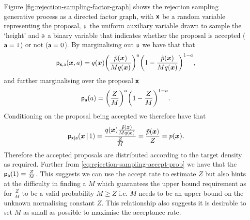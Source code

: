 Figure \ref{fig:rejection-sampling-factor-graph} shows the rejection sampling generative process as a directed factor graph, with $\boldsymbol{\mathsf{x}}$ be a random variable representing the proposal, $\mathsf{u}$ the uniform auxiliary variable drawn to sample the `height' and $\mathsf{a}$ a binary variable that indicates whether the proposal is accepted ($\mathsf{a} = 1$) or not ($\mathsf{a} = 0$). By marginalising out $\mathsf{u}$ we have that that
\begin{equation}\label{eq:rejection-sampling-joint-prob}
  \pden{\rvct{x},\rvar{a}}(\vct{x},a) = 
  q(\vct{x}) \lpa\frac{\utgtdens(\vct{x})}{Mq(\vct{x})}\rpa^a
  \lpa1 - \frac{\utgtdens(\vct{x})}{Mq(\vct{x})}\rpa^{1-a},
\end{equation}
and further marginalising over the proposal $\boldsymbol{\mathsf{x}}$
\begin{equation}\label{eq:rejection-sampling-accept-prob}
  \pden{\rvar{a}}(a) = \lpa\frac{Z}{M}\rpa^a \lpa 1 - \frac{Z}{M}\rpa^{1-a}.
\end{equation}
Conditioning on the proposal being accepted we therefore have that
\begin{equation}\label{eq:rejection-sampling-cond-dens-given-accept}
  \mathsf{p}_{\boldsymbol{\mathsf{x}}|\mathsf{a}}(\boldsymbol{x}\operatorname{|} 1) =
  \frac{q(\boldsymbol{x})\frac{\tilde{p}(\boldsymbol{x})}{Mq(\boldsymbol{x})}}{\frac{Z}{M}} = \frac{\tilde{p}(\boldsymbol{x})}{Z} = p(\boldsymbol{x}).
\end{equation}
Therefore the accepted proposals are distributed according to the target density as required. Further from \eqref{eq:rejection-sampling-accept-prob} we have that the $\mathsf{p}_{\mathsf{a}}(1) = \frac{Z}{M}$. This suggests we can use the accept rate to estimate $Z$ but also hints at the difficulty in finding a $M$ which guarantees the upper bound requirement as for $\frac{Z}{M}$ to be a valid probability $M \geq Z$ i.e. $M$ needs to be an upper bound on the unknown normalising constant $Z$. This relationship also suggests it is desirable to set $M$ as small as possible to maximise the acceptance rate. %


